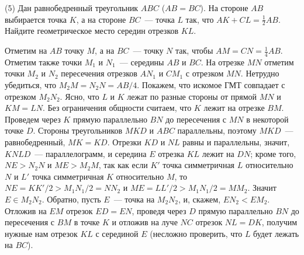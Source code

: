 \textsf{(5)}
Дан равнобедренный треугольник $ABC$ ($AB = BC$).
На стороне $AB$ выбирается точка $K$, а на стороне $BC$~--- точка $L$ так, что
$AK + CL = \frac{1}{2} AB$.
Найдите геометрическое место середин отрезков $KL$.

\solution
Отметим на $AB$ точку $M$, а на $BC$~--- точку $N$ так, чтобы
$AM = CN = \frac{1}{4} AB$.
Отметим также точки $M_1$ и $N_1$~--- середины $AB$ и $BC$.
На отрезке $MN$ отметим точки $M_2$ и $N_2$ пересечения отрезков
$AN_1$ и $CM_1$ с отрезком $MN$.
Нетрудно убедиться, что $M_2M = N_2N = AB / 4$.
Покажем, что искомое ГМТ совпадает с отрезком $M_2N_2$.
Ясно, что $L$ и $K$ лежат по разные стороны от прямой $MN$ и $KM = LN$.
Без ограничения общности считаем, что $K$ лежит на отрезке $BM$.
Проведем через $K$ прямую параллельно $BN$ до пересечения с $MN$ в некоторой
точке $D$.
Стороны треугольников $MKD$ и $ABC$ параллельны, поэтому $MKD$~---
равнобедренный, $MK = KD$.
Отрезки $KD$ и $NL$ равны и параллельны, значит, $KNLD$~--- параллелограмм,
и середина $E$ отрезка $KL$ лежит на $DN$;
кроме того, $NE > N_2N$ и $ME > M_2M$, так как если $K'$ точка симметричная $L$
относительно $N$ и $L'$ точка симметричная $K$ относительно $M$, то
$NE = KK' / 2 > M_1 N_1 / 2 = NN_2$ и $ME = LL' / 2 > M_1N_1 / 2 = MM_2$.
Значит $E \in M_2N_2$.
Обратно, пусть $E$~--- точка на $M_2N_2$, и, скажем, $EN_2 < EM_2$.
Отложив на $EM$ отрезок $ED = EN$, проведя через $D$ прямую параллельно $BN$ до
пересечения с $BM$ в точке $K$ и отложив на луче $NC$ отрезок $NL = DK$,
получим нужные нам отрезок $KL$ с серединой $E$
(несложно проверить, что $L$ будет лежать на $BC$). 

